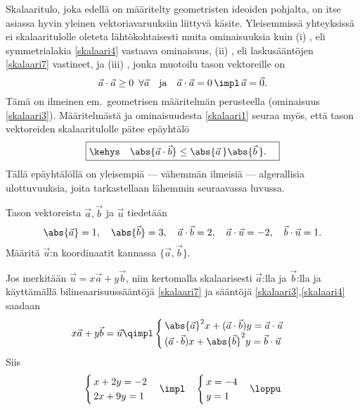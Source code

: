 Skalaaritulo, joka edellä on määritelty geometristen ideoiden pohjalta, on itse asiassa hyvin 
yleinen vektoriavaruuksiin liittyvä käsite. Yleisemmissä yhteyksissä ei skalaaritulolle oleteta
%
lähtökohtaisesti muita ominaisuuksia kuin (i) , eli symmetrialakia 
\eqref{skalaari4} vastaava ominaisuus, (ii) , eli laskusääntöjen 
\eqref{skalaari7} vastineet, ja
%
(iii) , jonka muotoilu tason vektoreille on
\[
\vec a \cdot \vec a \geq 0 \,\ \forall \vec a \quad \text{ja} \quad
             \vec a \cdot \vec a = 0  \,\impl\, \vec a = \vec 0.
\]
Tämä on ilmeinen em.\ geometrisen määritelmän perusteella (ominaisuus \eqref{skalaari3}).
Määritelmästä ja ominaisuudesta \eqref{skalaari1} seuraa myös, että tason vektoreiden 
skalaaritulolle pätee epäyhtälö
\begin{equation} \label{Cauchy-Schwarz}
\boxed{\kehys\quad\abs{\vec a \cdot \vec b} \leq \abs{\vec a\,} \abs{\vec b\,}. \quad}
\end{equation}
Tällä epäyhtälöllä on yleisempiä --- vähemmän ilmeisiä --- algerallisia ulottuvuuksia, joita
tarkastellaan lähemmin seuraavassa luvussa.
\begin{Exa}
Tason vektoreista $\vec a,\vec b$ ja $\vec u$ tiedetään
\[
\abs{\vec a}=1, \quad \abs{\vec b} = 3, \quad \vec a\cdot\vec b = 2, \quad 
\vec a\cdot\vec u = -2, \quad \vec b\cdot\vec u = 1.
\]
Määritä $\vec u$:n koordinaatit kannassa $\{\vec a,\vec b\}$. \end{Exa}
\ratk Jos merkitään $\vec u = x\vec a + y\vec b$, niin kertomalla skalaarisesti $\vec a$:lla ja
$\vec b$:lla ja käyttämällä bilineaarisuussääntöjä \eqref{skalaari7} ja sääntöjä 
\eqref{skalaari3},\eqref{skalaari4} saadaan
\[
x\vec a + y\vec b = \vec u 
                      \qimpl \begin{cases}
                             \,\abs{\vec a}^2 x + (\vec a\cdot\vec b) y = \vec a\cdot\vec u \\
                             \,(\vec a\cdot\vec b) x + \abs{\vec b}^2 y = \vec b\cdot\vec u
                             \end{cases}
\]
Siis
\[
\begin{cases} \,x + 2y = -2 \\ \,2x + 9y = 1 \end{cases} \impl\quad 
\begin{cases} \,x=-4 \\ \,y=1 \end{cases} \loppu
\]
